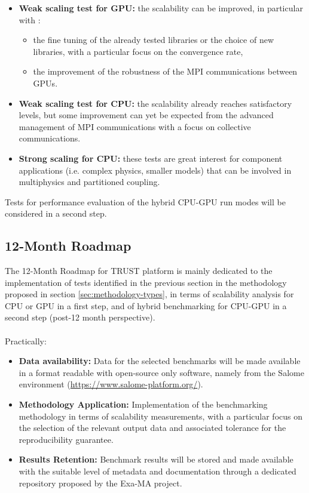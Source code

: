 \begin{itemize}
    \item \textbf{Weak scaling test for GPU: } the scalability can be improved, in particular with :
    \begin{itemize}
        \item the fine tuning of the already tested libraries or the choice of new libraries, with a particular focus on the convergence rate,
        \item the improvement of the robustness of the MPI communications between GPUs.
    \end{itemize}
    \item\textbf{Weak scaling test for CPU: } the scalability already reaches satisfactory levels, but some improvement can yet be expected from the advanced management of MPI communications with a focus on collective communications.
    \item \textbf{Strong scaling for CPU: } these tests are great interest for component applications (i.e. complex physics, smaller models) that can be involved in multiphysics and partitioned coupling.
\end{itemize}

Tests for performance evaluation of the hybrid CPU-GPU run modes will be considered in a second step.

\subsection{12-Month Roadmap}
\label{sec:WP3:TRUST Platform:roadmap}

The 12-Month Roadmap for TRUST platform is mainly dedicated to the implementation of tests identified in the previous section in the methodology proposed in section \ref{sec:methodology-types}, in terms of scalability analysis for CPU or GPU in a first step, and of hybrid benchmarking for CPU-GPU in a second step (post-12 month perspective).\\
\\
Practically:
\begin{itemize}
    \item \textbf{Data availability:} Data for the selected benchmarks will be made available in a format readable with open-source only software, namely from the Salome environment (\href{https://www.salome-platform.org/}{https://www.salome-platform.org/}).
    \item \textbf{Methodology Application:} Implementation of the benchmarking methodology in terms of scalability measurements, with a particular focus on the selection of the relevant output data and associated tolerance for the reproducibility guarantee.
    \item \textbf{Results Retention:} Benchmark results will be stored and made available with the suitable level of metadata and documentation through a dedicated repository proposed by the Exa-MA project.
\end{itemize}

